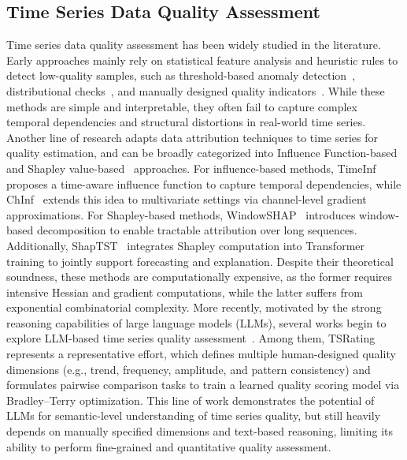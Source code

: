 \documentclass{article}
\begin{document}
\subsection{Time Series Data Quality Assessment}
Time series data quality assessment has been widely studied in the literature. Early approaches mainly rely on statistical feature analysis and heuristic rules to detect low-quality samples, such as threshold-based anomaly detection~\citep{clark2018adaptive}, distributional checks~\citep{tanaka2017time}, and manually designed quality indicators~\citep{wang2019time}. While these methods are simple and interpretable, they often fail to capture complex temporal dependencies and structural distortions in real-world time series.
Another line of research adapts data attribution techniques to time series for quality estimation, and can be broadly categorized into Influence Function-based~\citep{hampel1974influence} and Shapley value-based~\citep{shapley1953value} approaches. For influence-based methods, TimeInf~\citep{zhang2025timeinf} proposes a time-aware influence function to capture temporal dependencies, while ChInf~\citep{wang2024channel} extends this idea to multivariate settings via channel-level gradient approximations. For Shapley-based methods, WindowSHAP~\citep{nayebi2023windowshap} introduces window-based decomposition to enable tractable attribution over long sequences. Additionally, ShapTST~\citep{cheng2025unifying} integrates Shapley computation into Transformer training to jointly support forecasting and explanation. Despite their theoretical soundness, these methods are computationally expensive, as the former requires intensive Hessian and gradient computations, while the latter suffers from exponential combinatorial complexity.
More recently, motivated by the strong reasoning capabilities of large language models (LLMs), several works begin to explore LLM-based time series quality assessment~\citep{lan2025axis,cai2024timeseriesexam}. Among them, TSRating~\citep{wu2026rating} represents a representative effort, which defines multiple human-designed quality dimensions (e.g., trend, frequency, amplitude, and pattern consistency) and formulates pairwise comparison tasks to train a learned quality scoring model via Bradley--Terry optimization. This line of work demonstrates the potential of LLMs for semantic-level understanding of time series quality, but still heavily depends on manually specified dimensions and text-based reasoning, limiting its ability to perform fine-grained and quantitative quality assessment.
\end{document}
